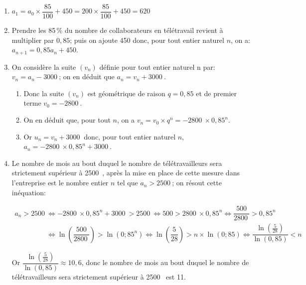\documentclass[10pt]{article}
\providecommand{\np}[2][]{{#2~#1}}
\begin{document}
\begin{enumerate}
\item $a_1 = a_0 \times \dfrac{85}{100}+ 450 = 200 \times \dfrac{85}{100}+ 450 = 620$

\item Prendre les 85\,\% du nombre de collaborateurs en télétravail revient à multiplier par $0,85$; puis on ajoute 450 donc, pour tout entier naturel $n$, on a:
$a_{n+1} = 0,85a_n + 450$.

\item On considère la suite $\left(v_n\right)$ définie pour tout entier naturel n par: $v_n = a_n - \np{3000}$; on en déduit que $a_n=v_n+\np{3000}$.

	\begin{enumerate}
		\item 
{}		
		
Donc la suite $(v_n)$ est géométrique de raison $q=0,85$ et de premier terme $v_0=-\np{2800}$.		
	
		\item On en déduit que, pour tout $n$, on a $v_n=v_0\times q^n = -\np{2800}\times 0,85^n$.
		
		\item Or $u_n=v_n+\np{3000}$ donc, pour tout entier naturel $n$,\,
$a_n = \np{- 2800} \times  0,85^n + \np{3000}$.
	\end{enumerate}
	
\item Le nombre de mois au bout duquel le nombre de télétravailleurs sera strictement supérieur à \np{2500}, après la mise en place de cette mesure dans l'entreprise est le nombre entier $n$ tel que $a_n>\np{2500}$; on résout cette inéquation:

$\begin{gathered}a_n>\np{2500}
\iff \np{- 2800} \times  0,85^n + \np{3000} > \np{2500}
\iff 500 > \np{2800} \times  0,85^n
\iff \dfrac{500}{\np{2800}} > 0,85^n\\[5pt]
\phantom{a_n>\np{2500}}
\iff \ln\left ( \dfrac{500}{\np{2800}} \right ) > \ln \left (0;85^n\right )
\iff \ln\left ( \dfrac{5}{28} \right ) > n\times \ln \left (0;85\right )
\iff \dfrac{\ln\left ( \frac{5}{28} \right )}{\ln \left (0,85\right )} <n\end{gathered}$

Or $\dfrac{\ln\left ( \frac{5}{28} \right )}{\ln \left (0,85\right )}\approx 10,6$, donc le nombre de mois au bout duquel le nombre de télétravailleurs sera strictement supérieur à \np{2500} est 11.

\end{enumerate}
\end{document}
